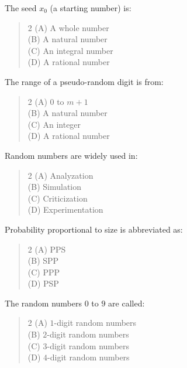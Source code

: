 \documentclass[11pt,a4paper]{article}
\begin{document}
\begin{mcqlist}
\item The seed $x_0$ (a starting number) is:
\begin{quote}\begin{multicols}{2}
\noindent (A) A whole number \\
(B) A natural number \\
(C) An integral number \\
(D) A rational number
\end{multicols}\end{quote}

\item The range of a pseudo-random digit is from:
\begin{quote}\begin{multicols}{2}
\noindent (A) $0$ to $m+1$ \\
(B) A natural number \\
(C) An integer \\
(D) A rational number
\end{multicols}\end{quote}

\item Random numbers are widely used in:
\begin{quote}\begin{multicols}{2}
\noindent (A) Analyzation \\
(B) Simulation \\
(C) Criticization \\
(D) Experimentation
\end{multicols}\end{quote}

\item Probability proportional to size is abbreviated as:
\begin{quote}\begin{multicols}{2}
\noindent (A) PPS \\
(B) SPP \\
(C) PPP \\
(D) PSP
\end{multicols}\end{quote}

\item The random numbers $0$ to $9$ are called:
\begin{quote}\begin{multicols}{2}
\noindent (A) $1$-digit random numbers \\
(B) $2$-digit random numbers \\
(C) $3$-digit random numbers \\
(D) $4$-digit random numbers
\end{multicols}\end{quote}


\end{mcqlist}
\end{document}
